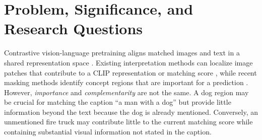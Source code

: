\documentclass[10pt,twocolumn]{article}
\begin{document}

\begin{abstract}
Given an image and caption, can regional scores identify visible facts that the caption leaves uncovered? The initial 350-image Flickr30K pilot does not support our lightweight scorer's superiority: its three-seed mean intervention Accuracy@1 is 77.22\%, versus 84.50\% for inverse crop--text similarity. We will validate labels, correct evaluation ambiguities, and test frozen-model transfer before further model development. A rigorous comparison and failure analysis is a valid course outcome. Publication expansion is conditional on new evidence; if the task is unreliable or adequately solved by strong simple baselines, we will recommend changing direction.
\end{abstract}

\section{Problem, Significance, and Research Questions}
Contrastive vision-language pretraining aligns matched images and text in a shared representation space \cite{radford2021}. Existing interpretation methods can localize image patches that contribute to a CLIP representation or matching score \cite{gandelsman2024,zhao2026}, while recent masking methods identify concept regions that are important for a prediction \cite{agarwal2026}. However, \emph{importance} and \emph{complementarity} are not the same. A dog region may be crucial for matching the caption ``a man with a dog'' but provide little information beyond the text because the dog is already mentioned. Conversely, an unmentioned fire truck may contribute little to the current matching score while containing substantial visual information not stated in the caption.
\end{document}
